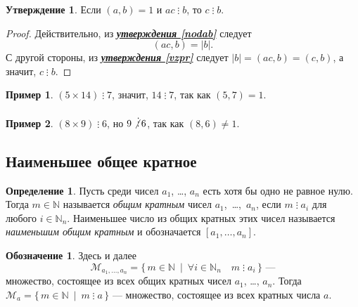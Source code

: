\documentclass[14pt, a4paper]{extarticle}
\theoremstyle{definition}
\newtheorem*{definition}{Определение}
\newtheorem*{desig}{Обозначение}
\newtheorem{example}{Пример}
\newtheorem{statement}{Утверждение}
\newcommand{\divisible}{\mathop{\vdots}}
\begin{document}
	\begin{statement}
	\label{divpr}
		Если $(a,b)=1$ и $ac\divisible b$, то $c\divisible b$.
	\end{statement}
	\begin{proof}
		Действительно, из \hyperref[nodab]{\textbf{\textit{утверждения \ref*{nodab}}}} следует $$(ac,b)=|b|.$$ С другой стороны, из \hyperref[vzpr]{\textbf{\textit{утверждения \ref*{vzpr}}}} следует $|b|=(ac,b)=(c,b)$, а значит, $c\divisible b$.
	\end{proof}

	\begin{example}
		$(5\times14)\divisible7$, значит, $14\divisible7$, так как $(5,7)=1$.
	\end{example}
	\begin{example}
		$(8\times9)\divisible 6$, но $9\not\divisible6$, так как $(8,6)\neq1$.
	\end{example}

\subsection{Наименьшее общее кратное}
\label{nok}
	
	\begin{definition}
		Пусть среди чисел $a_1$, \dots, $a_n$ есть хотя бы одно не равное нулю. Тогда $m\in\mathbb{N}$ называется \emph{общим кратным} чисел \mbox{$a_1$, \dots, $a_n$}, если $m\divisible a_i$ для любого $i\in\mathbb{N}_n$. Наименьшее число из общих кратных этих чисел называется \emph{наименьшим общим кратным} и обозначается $[a_1,\dots,a_n]$.
	\end{definition}
	
	\begin{desig}
		Здесь и далее $$\mathcal{M}_{a_1,\dots,a_n}=\{\,m\in\mathbb{N}\:\mid\:\forall i\in\mathbb{N}_n\quad m\divisible a_i\,\}\text{ ---}$$ множество, состоящее из всех общих кратных чисел $a_1$, \dots, $a_n$. Тогда $\mathcal{M}_a=\{\,m\in\mathbb{N}\:\mid\:m\divisible a\,\}$ --- множество, состоящее из всех кратных числа $a$.
	\end{desig}
\end{document}
